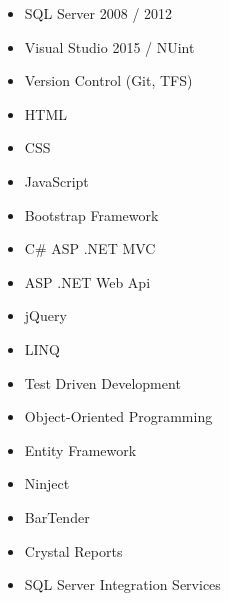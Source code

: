 \descriptionstyle
{
\begin{multicols}{3}
\begin{itemize}[leftmargin=2ex, nosep, noitemsep]
\item {SQL Server 2008 / 2012}
\item {Visual Studio 2015 / NUint}
\item {Version Control (Git, TFS)}
\item {HTML}
\item {CSS}
\item {JavaScript}
\item {Bootstrap Framework}
\item {C\# ASP .NET MVC}
\item {ASP .NET Web Api}
\item {jQuery}
\item {LINQ}
\item {Test Driven Development}
\item {Object-Oriented Programming}
\item {Entity Framework}
\item {Ninject}
\item {BarTender}
\item {Crystal Reports}
\item {SQL Server Integration Services}
\end{itemize}
\end{multicols}
}
